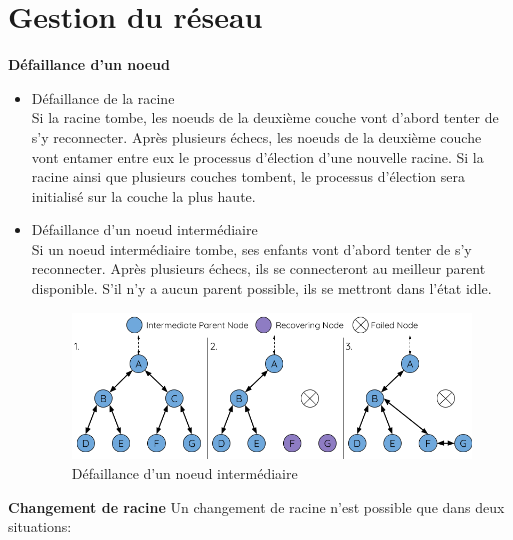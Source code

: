         \section{Gestion du réseau}
        \textbf{Défaillance d'un noeud}\newline
            \begin{itemize}
                \item Défaillance de la racine\label{root_fail}\\
                    Si la racine tombe, les noeuds de la deuxième couche vont d'abord tenter de s'y reconnecter.
                    Après plusieurs échecs, les noeuds de la deuxième couche vont entamer entre eux le processus d'élection d'une nouvelle racine.
                    Si la racine ainsi que plusieurs couches tombent, le processus d'élection sera initialisé sur la couche la plus haute.


                \item Défaillance d'un noeud intermédiaire\\
                    Si un noeud intermédiaire tombe, ses enfants vont d'abord tenter de s'y reconnecter.
                    Après plusieurs échecs, ils se connecteront au meilleur parent disponible.
                    S'il n'y a aucun parent possible, ils se mettront dans l'état idle.
                    \begin{figure}[H]
                        \centering
                        \includegraphics[scale=0.5]{images/mesh-parent-node-failure.png}
                        \caption{Défaillance d'un noeud intermédiaire\cite{esp-mesh}}
                    \end{figure}
            \end{itemize}
            \vspace{0.5cm}
            \textbf{Changement de racine}\newline
                Un changement de racine n'est possible que dans deux situations:
